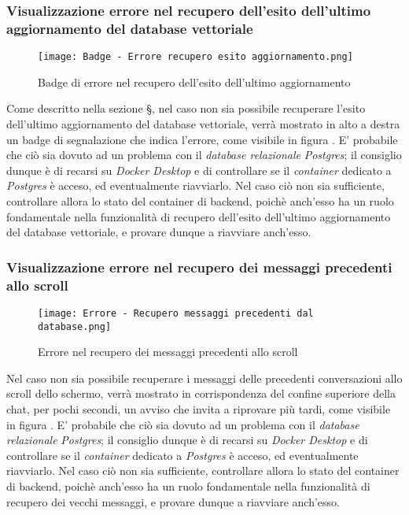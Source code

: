 \subsubsection{Visualizzazione errore nel recupero dell'esito dell'ultimo aggiornamento del database vettoriale}

\begin{figure}[h]
    \centering
        \texttt{[image: Badge - Errore recupero esito aggiornamento.png]}
        \caption{Badge di errore nel recupero dell'esito dell'ultimo aggiornamento}
        \label{fig:Badge di errore nel recupero dell'esito dell'ultimo aggiornamento}
\end{figure}

Come descritto nella sezione \S{}, nel caso non sia possibile recuperare l'esito dell'ultimo aggiornamento del database vettoriale, verrà mostrato in alto a destra un badge di segnalazione che indica l'errore, come visibile in figura . E' probabile che ciò sia dovuto ad un problema con il \emph{database relazionale} \emph{Postgres}; il consiglio dunque è di recarsi su \emph{Docker Desktop} e di controllare se il \emph{container} dedicato a \emph{Postgres} è acceso, ed eventualmente riavviarlo. Nel caso ciò non sia sufficiente, controllare allora lo stato del container di backend, poichè anch'esso ha un ruolo fondamentale nella funzionalità di recupero dell'esito dell'ultimo aggiornamento del database vettoriale, e provare dunque a riavviare anch'esso.


\subsubsection{Visualizzazione errore nel recupero dei messaggi precedenti allo scroll}

\begin{figure}[h]
    \centering
        \texttt{[image: Errore - Recupero messaggi precedenti dal database.png]}
        \caption{Errore nel recupero dei messaggi precedenti allo scroll}
        \label{fig:Errore nel recupero dei messaggi precedenti allo scroll}
\end{figure}

Nel caso non sia possibile recuperare i messaggi delle precedenti conversazioni allo scroll dello schermo, verrà mostrato in corrispondenza del confine superiore della chat, per pochi secondi, un avviso che invita a riprovare più tardi, come visibile in figura . E' probabile che ciò sia dovuto ad un problema con il \emph{database relazionale} \emph{Postgres}; il consiglio dunque è di recarsi su \emph{Docker Desktop} e di controllare se il \emph{container} dedicato a \emph{Postgres} è acceso, ed eventualmente riavviarlo. Nel caso ciò non sia sufficiente, controllare allora lo stato del container di backend, poichè anch'esso ha un ruolo fondamentale nella funzionalità di recupero dei vecchi messaggi, e provare dunque a riavviare anch'esso.
